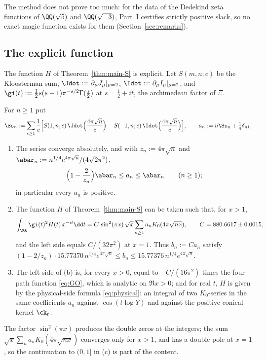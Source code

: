 The method does not prove too much: for the data of the Dedekind zeta functions of $\QQ(\sqrt5)$ and $\QQ(\sqrt{-3})$, Part~I certifies
strictly positive slack, so no exact magic function exists for them (Section~\ref{sec:remarks}).

\subsection{The explicit function}

The function $H$ of Theorem~\ref{thm:main-S} is explicit. Let $S(m,n;c)$ be the Kloosterman sum, $\Jdot:=\partial_\mu J_\mu|_{\mu=2}$,
$\Idot:=\partial_\mu I_\mu|_{\mu=2}$, and $\gi(t):=\frac12s(s-1)\pi^{-s/2}\Gamma(\frac s2)$ at $s=\frac12+it$, the archimedean factor of $\Xi$.

\begin{mainthm}\label{thm:main-object}
For $n\ge1$ put
\[
\Ss_n:=\sum_{c\ge1}\frac1c\Big[S(1,n;c)\,\Jdot\Big(\frac{4\pi\sqrt n}c\Big)-S(-1,n;c)\,\Idot\Big(\frac{4\pi\sqrt n}c\Big)\Big],\qquad
a_n:=n\Ss_n+\tfrac14\delta_{n1}.
\]
\begin{enumerate}[label=\textup{(\alph*)}]
\item The series converge absolutely, and with $z_n:=4\pi\sqrt n$ and $\abar_n:=n^{1/4}e^{4\pi\sqrt n}/(4\sqrt2\pi^2)$,
\[
\Big(1-\frac2{z_n}\Big)\abar_n\le a_n\le\abar_n\qquad(n\ge1);
\]
in particular every $a_n$ is positive.
\item The function $H$ of Theorem~\ref{thm:main-S} can be taken such that, for $x>1$,
\[
\int_\RR\gi(t)^2H(t)\,x^{-it}\dd t=C\,\sin^2(\pi x)\,\sqrt x\sum_{n\ge1}a_nK_0(4\pi\sqrt{nx}),\qquad C=880.6617\pm0.0015,
\]
and the left side equals $C/(32\pi^2)$ at $x=1$. Thus $b_n:=Ca_n$ satisfy
$(1-2/z_n)\cdot15.77370\,n^{1/4}e^{4\pi\sqrt n}\le b_n\le15.77376\,n^{1/4}e^{4\pi\sqrt n}$.
\item The left side of \textup{(b)} is, for every $x>0$, equal to $-C/(16\pi^2)$ times the four-path function \eqref{eq:GO}, which is analytic
on $\Re x>0$; and for real $t$, $H$ is given by the physical-side formula \eqref{eq:physical}: an integral of two $K_0$-series in the same
coefficients $a_n$ against $\cos(t\log Y)$ and against the positive conical kernel $\ck_t$.
\end{enumerate}
\end{mainthm}

The factor $\sin^2(\pi x)$ produces the double zeros at the integers; the sum $\sqrt x\sum_na_nK_0(4\pi\sqrt{nx})$ converges only for $x>1$, and
has a double pole at $x=1$, so the continuation to $(0,1]$ in (c) is part of the content.

